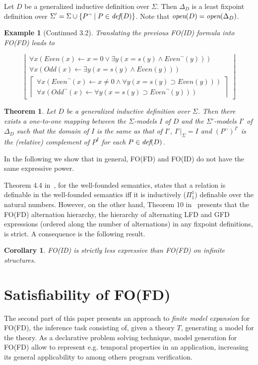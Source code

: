 \documentclass{tlp}
\newcommand{\rul}{\leftarrow}
\newcommand{\lfd}[1]{\ensuremath{\left \lfloor \begin{array}{l}#1\end{array} \right \rfloor }}
\newcommand{\gfd}[1]{\ensuremath{\left \lceil \begin{array}{l}#1\end{array} \right \rceil}}
\newcommand{\D}{D\xspace}
\newcommand{\LFD}{\ensuremath{\Delta}\xspace}
\newcommand{\defp}[1]{\ensuremath{\mbox{\it def}(#1)}\xspace}
\newcommand{\openp}[1]{\ensuremath{\mbox{\it open}(#1)}\xspace}
\newtheorem{theorem}[lemma]{Theorem}
\newtheorem{corollary}[lemma]{Corollary}
\newtheorem{example}[lemma]{Example}
\begin{document}
Let $D$ be a generalized inductive definition over $\Sigma$. Then $\LFD_{D}$ is a least fixpoint definition over $\Sigma' = \Sigma \cup \{P^{\neg} \mid P \in \defp{D} \}$. Note that $\openp{D} = \openp{\LFD_{D}}$.

\begin{example}[Continued 3.2]
Translating the previous FO(ID) formula into FO(FD) leads to

\[\lfd{ \forall x (Even(x) \rul x = 0 \lor \exists y (x = s(y) \land
{Even}^{\neg}(y))) \\ \forall x (Odd(x) \rul \exists y(x = s(y) \land Even(y))) \\
\gfd{\forall x ({Even}^{\neg}(x) \rul x \not = 0 \land \forall y (x = s(y)
\supset Even(y)))\\ \forall x ({Odd}^{\neg}(x) \rul \forall y (x = s(y) \supset
     {Even}^{\neg}(y)))}}\]
\end{example}

\begin{theorem}
Let $D$ be a generalized inductive definition over $\Sigma$. Then there exists a one-to-one mapping between the $\Sigma$-models $I$ of $D$ and the $\Sigma'$-models $I'$ of $\LFD_\D$ such that the domain of $I$ is the same as that of $I'$, $I' |_\Sigma = I$ and $(P^{\neg})^{I'}$ is the (relative) complement of $P^I$ for each $P \in \defp{D}$.
\end{theorem}

In the following we show that in general, FO(FD) and FO(ID) do not have the same expressive power.

Theorem 4.4 in~\cite{jcss/Schlipf95}, for the well-founded semantics, states that a relation is definable in the well-founded semantics iff it is inductively ($\Pi_{1}^{1}$) definable over the natural numbers. However, on the other hand, Theorem 10 in~\cite{concur/Bradfield96} presents that the FO(FD) alternation hierarchy, the hierarchy of alternating LFD and GFD expressions (ordered along the number of alternations) in any fixpoint definitions, is strict. A consequence is the following result.
\begin{corollary}
FO(ID) is strictly less expressive than FO(FD) on infinite structures.
\end{corollary}

\section{Satisfiability of FO(FD)}\label{sec:satfd}
The second part of this paper presents an approach to \emph{finite model expansion} for FO(FD), the inference task consisting of, given a theory $T$, generating a model for the theory. As a declarative problem solving technique, model generation for FO(FD) allow to represent e.g. temporal properties in an application, increasing its general applicability to among others program verification.
\end{document}

